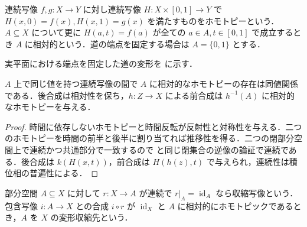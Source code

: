 \begin{defn}[ホモトピーと相対ホモトピー]
連続写像 $f,g:X\to Y$ に対し連続写像 $H:X\times[0,1]\to Y$ で $H(x,0)=f(x),H(x,1)=g(x)$ を満たすものをホモトピーという．$A\subseteq X$ について更に $H(a,t)=f(a)$ が全ての $a\in A,t\in[0,1]$ で成立するとき $A$ に相対的という．道の端点を固定する場合は $A=\{0,1\}$ とする．
\end{defn}
実平面における端点を固定した道の変形を  に示す．
\begin{prop}[相対ホモトピーの同値性]
$A$ 上で同じ値を持つ連続写像の間で $A$ に相対的なホモトピーの存在は同値関係である．後合成は相対性を保ち，$h:Z\to X$ による前合成は $h^{-1}(A)$ に相対的なホモトピーを与える．
\end{prop}
\begin{proof}
時間に依存しないホモトピーと時間反転が反射性と対称性を与える．二つのホモトピーを時間の前半と後半に割り当てれば推移性を得る．二つの閉部分空間上で連続かつ共通部分で一致するので  と同じ閉集合の逆像の論証で連続である．後合成は $k(H(x,t))$，前合成は $H(h(z),t)$ で与えられ，連続性は積位相の普遍性による．
\end{proof}
\begin{defn}[変形収縮]
部分空間 $A\subseteq X$ に対して $r:X\to A$ が連続で $r|_A=\operatorname{id}_A$ なら収縮写像という．包含写像 $i:A\to X$ との合成 $i\circ r$ が $\operatorname{id}_X$ と $A$ に相対的にホモトピックであるとき，$A$ を $X$ の変形収縮先という．
\end{defn}
